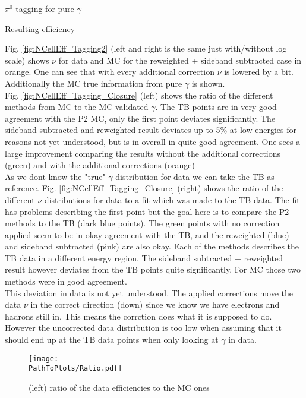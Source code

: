 \documentclass[ALICE]{ALICE_analysis_notes}
\newcommand{\PZ}{$\pi^0$\xspace}
\newcommand{\g}{$\gamma$\xspace}
\newcommand{\PathToPlots}{/home/joshua/PCG_Software/EMCal_NCellEffi/13TeVNomB_Wide/Pi0Tagging_13TeV_nom_04_26_WithTRD_WithBorderCells_1cellFT/pdf}
\begin{document}
\begin{section}{\PZ tagging for pure \g}
\begin{subsection}{Resulting efficiency}
\begin{figure}[ht!]
	\end{figure}
	
	Fig. \ref{fig:NCellEff_Tagging2} (left and right is the same just with/without log scale) shows $\nu$ for data and MC for the reweighted + sideband subtracted case in orange. One can see that with every additional correction $\nu$ is lowered by a bit. Additionally the MC true information from pure \g is shown.\\
	Fig. \ref{fig:NCellEff_Tagging_Closure} (left) shows the ratio of the different methods from MC to the MC validated \g. The TB points are in very good agreement with the P2 MC, only the first point deviates significantly. The sideband subtracted and reweighted result deviates up to 5\% at low energies for reasons not yet understood, but is in overall in quite good agreement. One sees a large improvement comparing the results without the additional corrections (green) and with the additional corrections (orange) \\
	As we dont know the "true" \g distribution for data we can take the TB as reference. Fig. \ref{fig:NCellEff_Tagging_Closure} (right) shows the ratio of the different $\nu$ distributions for data to a fit which was made to the TB data. The fit has problems describing the first point but the goal here is to compare the P2 methods to the TB (dark blue points). The green points with no correction applied seem to be in okay agreement with the TB, and the reweighted (blue) and sideband subtracted (pink) are also okay. Each of the methods describes the TB data in a different energy region. The sideband subtracted + reweighted result however deviates from the TB points quite significantly. For MC those two methods were in good agreement.\\
	This deviation in data is not yet understood. The applied corrections move the data $\nu$ in the correct direction (down) since we know we have electrons and hadrons still in. This means the corrction does what it is supposed to do. However the uncorrected data distribution is too low when assuming that it should end up at the TB data points when only looking at \g in data.
	
	
	\begin{figure}[ht!]
		\centering
		\texttt{[image: \\PathToPlots/Ratio.pdf]}		
		\caption{ (left) ratio of the data efficiencies to the MC ones}
		\label{fig:NCellEff_Tagging_Corr}
		
	\end{figure}
	
\end{subsection}




\end{section}
\end{document}
